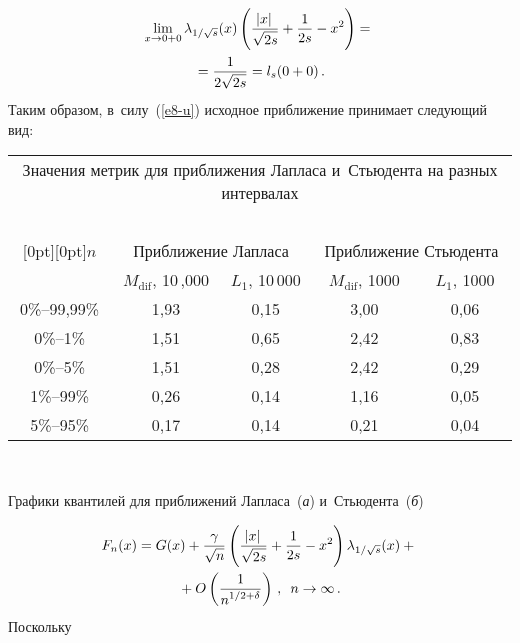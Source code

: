 \begin{multicols}{2}
  \vspace*{-12pt}
  
  \noindent
  \begin{multline*}
\lim\limits_{x\rightarrow 0+0}\lambda_{1/\sqrt{s}}(x)\left( 
\displaystyle\frac{\displaystyle \left|x\right|\mathstrut}{\displaystyle \sqrt{2s}\mathstrut}+\displaystyle\frac{\displaystyle 1\mathstrut}{\displaystyle 2s\mathstrut}-x^2\right) = {}\\
{}=\displaystyle\frac{\displaystyle 1\mathstrut}{\displaystyle 2\sqrt{2s}\mathstrut}
  = l_s(0+0)\,. 
  \end{multline*}
Таким образом, в~силу~(\ref{e8-u}) исходное приближение принимает следующий вид: 

\begin{table*}[b]\small
\begin{center}

\begin{tabular}{|c|c|c|c|c|}
\multicolumn{5}{p{102mm}}{Значения метрик для приближения Лапласа 
и~Стьюдента на разных интервалах}  \\
\multicolumn{5}{c}{\ }\\[-6pt]
\hline
\multicolumn{1}{|c|}{\raisebox{-6pt}[0pt][0pt]{$n$}} & \multicolumn{2}{c|}{Приближение Лапласа} &  \multicolumn{2}{c|}{Приближение Стьюдента} \\
\cline{2-5}
&$M_{\mathrm{dif}}$, 10\,,000 & $L_1$, 10\,000 & $M_{\mathrm{dif}}$, 1000 & $L_1$, 1000\\
\hline
\hphantom{,99}0\%--99,99\% &  1,93 & 0,15& 3,00& 0,06\\
0\%--1\%\hphantom{9} &  1,51     & 0,65& 2,42& 0,83\\
0\%--5\%\hphantom{9} &  1,51     & 0,28& 2,42& 0,29\\
1\%--99\% & 0,26& 0,14& 1,16& 0,05\\
 5\%--95\%& 0,17& 0,14& 0,21& 0,04\\
\hline
\end{tabular}
\end{center}
\vspace*{6pt}
 \begin{center}
 \mbox{%
 \epsfxsize=162.484mm
 }
\vspace*{3pt}

\noindent
{\small Графики квантилей для приближений Лапласа~(\textit{а}) и~Стьюдента~(\textit{б})}
 \end{center}
\end{table*}

\noindent
\begin{multline}
\label{e10-u}
F_{n}(x)=G(x)+\displaystyle\frac{\displaystyle \gamma\mathstrut}{\displaystyle \sqrt{n}\mathstrut}\left( 
\displaystyle\frac{\displaystyle \left|x\right|\mathstrut}{\displaystyle \sqrt{2s}\mathstrut}+\displaystyle\frac{\displaystyle 1\mathstrut}{\displaystyle 2s\mathstrut}-x^2\right)
\lambda_{1/\sqrt{s}}(x)+{}\\
{}+O\left(\displaystyle\frac{\displaystyle 1\mathstrut}{\displaystyle n^{1/2+\delta}\mathstrut}\right)\,,\enskip
 n\rightarrow\infty\,.
\end{multline}
 Поскольку
 

\end{multicols}
